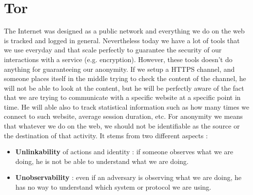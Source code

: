 \section{Tor}
The Internet was designed as a public network and everything we do on the web is tracked and logged in general. Nevertheless today we have a lot of tools that we use everyday and that scale perfectly to guarantee the security of our interactions with a service (e.g. encryption). However, these tools doesn't do anything for guaranteeing our anonymity. If we setup a HTTPS channel, and someone places itself in the middle trying to check the content of the channel, he will not be able to look at the content, but he will be perfectly aware of the fact that we are trying to communicate with a specific website at a specific point in time. He will able also to track statistical information such as how many times we connect to such website, average session duration, etc. For anonymity we means that whatever we do on the web, we should not be identifiable as the source or the destination of that activity. It stems from two different aspects : 
\begin{itemize}
\item \textbf{Unlinkability} of actions and identity : if someone observes what we are doing, he is not be able to understand what we are doing.
\item \textbf{Unobservability} : even if an adversary is observing what we are doing, he has no way to understand which system or protocol we are using.
\end{itemize}
